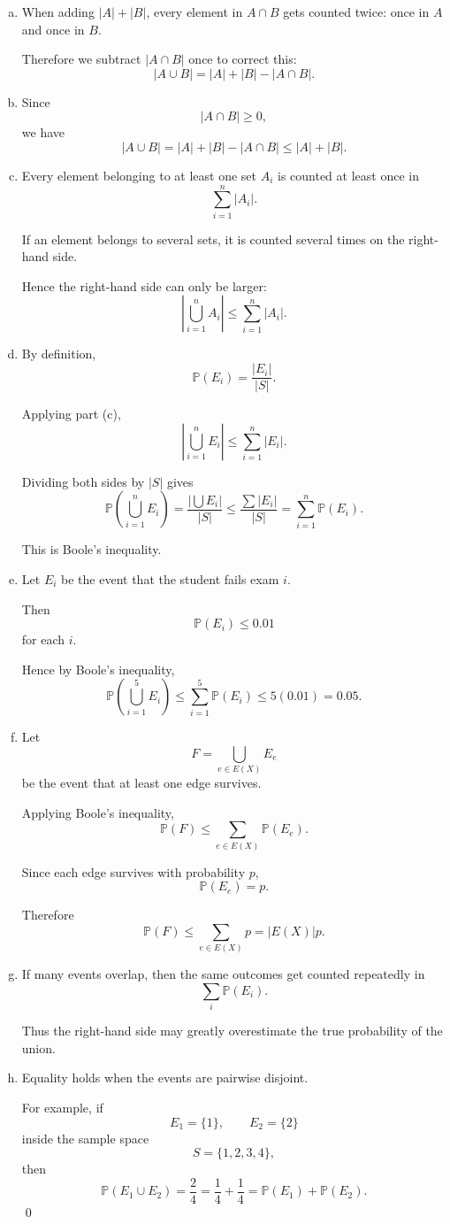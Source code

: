 \documentclass[12pt]{article}
\begin{document}
\begin{enumerate}[(a)]

\item When adding $|A|+|B|$, every element in $A\cap B$
gets counted twice:
once in $A$ and once in $B$.

Therefore we subtract $|A\cap B|$ once to correct this:
\[
|A\cup B|
=
|A|+|B|-|A\cap B|.
\]

\item Since
\[
|A\cap B|\geq 0,
\]
we have
\[
|A\cup B|
=
|A|+|B|-|A\cap B|
\leq
|A|+|B|.
\]

\item Every element belonging to at least one set $A_i$
is counted at least once in
\[
\sum_{i=1}^n |A_i|.
\]

If an element belongs to several sets,
it is counted several times on the right-hand side.

Hence the right-hand side can only be larger:
\[
\left|\bigcup_{i=1}^n A_i\right|
\leq
\sum_{i=1}^n |A_i|.
\]

\item By definition,
\[
\mathbb{P}(E_i)=\frac{|E_i|}{|S|}.
\]

Applying part (c),
\[
\left|\bigcup_{i=1}^n E_i\right|
\leq
\sum_{i=1}^n |E_i|.
\]

Dividing both sides by $|S|$ gives
\[
\mathbb{P}\left(\bigcup_{i=1}^n E_i\right)
=
\frac{\left|\bigcup E_i\right|}{|S|}
\leq
\frac{\sum |E_i|}{|S|}
=
\sum_{i=1}^n \mathbb{P}(E_i).
\]

This is Boole's inequality.

\item Let $E_i$ be the event that the student fails exam $i$.

Then
\[
\mathbb{P}(E_i)\leq 0.01
\]
for each $i$.

Hence by Boole's inequality,
\[
\mathbb{P}\left(\bigcup_{i=1}^5 E_i\right)
\leq
\sum_{i=1}^5 \mathbb{P}(E_i)
\leq
5(0.01)
=
0.05.
\]

\item Let
\[
F=\bigcup_{e\in E(X)} E_e
\]
be the event that at least one edge survives.

Applying Boole's inequality,
\[
\mathbb{P}(F)
\leq
\sum_{e\in E(X)} \mathbb{P}(E_e).
\]

Since each edge survives with probability $p$,
\[
\mathbb{P}(E_e)=p.
\]

Therefore
\[
\mathbb{P}(F)
\leq
\sum_{e\in E(X)} p
=
|E(X)|p.
\]

\item If many events overlap,
then the same outcomes get counted repeatedly in
\[
\sum_i \mathbb{P}(E_i).
\]

Thus the right-hand side may greatly overestimate the true probability of the union.

\item Equality holds when the events are pairwise disjoint.

For example, if
\[
E_1=\{1\},
\qquad
E_2=\{2\}
\]
inside the sample space
\[
S=\{1,2,3,4\},
\]
then
\[
\mathbb{P}(E_1\cup E_2)
=
\frac{2}{4}
=
\frac14+\frac14
=
\mathbb{P}(E_1)+\mathbb{P}(E_2).
\]
\qed

\end{enumerate}
\end{document}
